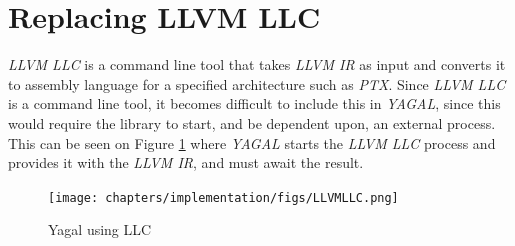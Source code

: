 \section{Replacing LLVM LLC} \label{sec:llcReplacement}
\textit{LLVM LLC} is a command line tool that takes \textit{LLVM IR} as input and converts it to assembly language for a specified architecture such as \textit{PTX}. Since \textit{LLVM LLC} is a command line tool, it becomes difficult to include this in \textit{YAGAL}, since this would require the library to start, and be dependent upon, an external process. This can be seen on Figure \ref{fig:yagalLLC} where \textit{YAGAL} starts the \textit{LLVM LLC} process and provides it with the \textit{LLVM IR}, and must await the result.

\begin{figure}[!htb]
    \centering
    \begin{minipage}{.7\textwidth}
        \centering
        \texttt{[image: chapters/implementation/figs/LLVMLLC.png]}
        \caption{Yagal using LLC}
        \label{fig:yagalLLC}
    \end{minipage}
    \begin{minipage}{0.4\textwidth}
        \centering

\end{minipage}
\end{figure}
